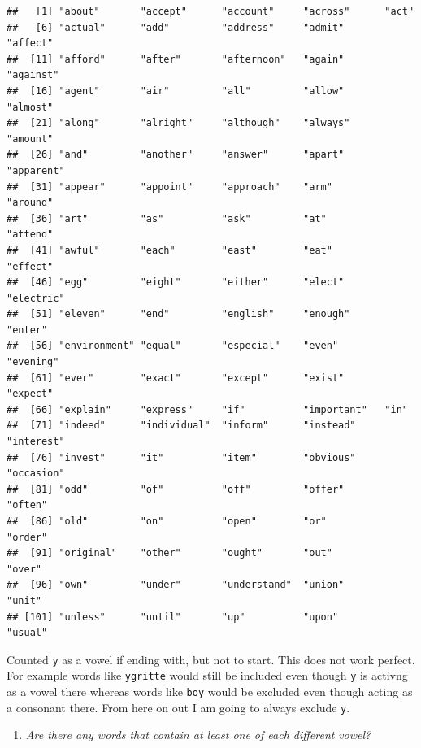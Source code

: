 \documentclass[]{book}
\providecommand{\tightlist}{%
  \setlength{\itemsep}{0pt}\setlength{\parskip}{0pt}}
\theoremstyle{definition}
\theoremstyle{definition}
\theoremstyle{definition}
\theoremstyle{remark}
\begin{document}
\begin{enumerate}
\begin{verbatim}
##   [1] "about"       "accept"      "account"     "across"      "act"        
##   [6] "actual"      "add"         "address"     "admit"       "affect"     
##  [11] "afford"      "after"       "afternoon"   "again"       "against"    
##  [16] "agent"       "air"         "all"         "allow"       "almost"     
##  [21] "along"       "alright"     "although"    "always"      "amount"     
##  [26] "and"         "another"     "answer"      "apart"       "apparent"   
##  [31] "appear"      "appoint"     "approach"    "arm"         "around"     
##  [36] "art"         "as"          "ask"         "at"          "attend"     
##  [41] "awful"       "each"        "east"        "eat"         "effect"     
##  [46] "egg"         "eight"       "either"      "elect"       "electric"   
##  [51] "eleven"      "end"         "english"     "enough"      "enter"      
##  [56] "environment" "equal"       "especial"    "even"        "evening"    
##  [61] "ever"        "exact"       "except"      "exist"       "expect"     
##  [66] "explain"     "express"     "if"          "important"   "in"         
##  [71] "indeed"      "individual"  "inform"      "instead"     "interest"   
##  [76] "invest"      "it"          "item"        "obvious"     "occasion"   
##  [81] "odd"         "of"          "off"         "offer"       "often"      
##  [86] "old"         "on"          "open"        "or"          "order"      
##  [91] "original"    "other"       "ought"       "out"         "over"       
##  [96] "own"         "under"       "understand"  "union"       "unit"       
## [101] "unless"      "until"       "up"          "upon"        "usual"
\end{verbatim}

  Counted \texttt{y} as a vowel if ending with, but not to start. This
  does not work perfect. For example words like \texttt{ygritte} would
  still be included even though \texttt{y} is activng as a vowel there
  whereas words like \texttt{boy} would be excluded even though acting
  as a consonant there. From here on out I am going to always exclude
  \texttt{y}.

  \begin{enumerate}
  \def\labelenumii{\arabic{enumii}.}
  \setcounter{enumii}{2}
  \tightlist
  \item
    \emph{Are there any words that contain at least one of each
    different} \emph{vowel?}
  \end{enumerate}


\end{enumerate}
\end{document}
